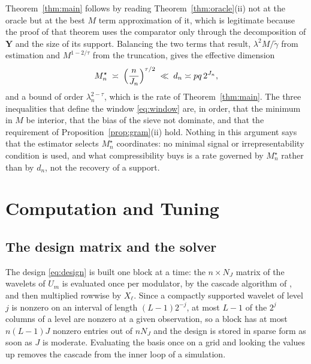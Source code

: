 \documentclass[12pt]{article} %
\theoremstyle{definition}
\newcommand{\cv}{\ell}
\newcommand{\md}{m}
\newcommand{\lev}{j}
\newcommand{\NJ}{N_{J}}
\newcommand{\pen}{\lambda}
\newcommand{\penn}{\lambda_{n}}
\newcommand{\bY}{\mathbf{Y}}
\newcommand{\gtil}{\widetilde{\gamma}}
\newcommand{\Mstar}{M^{\star}}
\begin{document}
Theorem~\ref{thm:main} follows by reading Theorem~\ref{thm:oracle}(ii) not at
the oracle but at the best $M$ term approximation of it, which is legitimate
because the proof of that theorem uses the comparator only through the
decomposition of $\bY$ and the size of its support. Balancing the two terms
that result, $\pen^{2}M/\gtil$ from estimation and
$M^{1-2/\tau}$ from the truncation, gives the effective dimension
\begin{equation}
  \label{eq:Mstar}
  \Mstar_n \;\asymp\; \Bigl(\frac{n}{J_n}\Bigr)^{\tau/2}
  \;\ll\; d_n \asymp pq\,2^{J_n},
\end{equation}
and a bound of order $\penn^{2-\tau}$, which is the rate of
Theorem~\ref{thm:main}. The three inequalities that define the window
\eqref{eq:window} are, in order, that the minimum in $M$ be interior, that the
bias of the sieve not dominate, and that the requirement of
Proposition~\ref{prop:gram}(ii) hold. Nothing in this argument says that the
estimator selects $\Mstar_n$ coordinates: no minimal signal or
irrepresentability condition is used, and what compressibility buys is a rate
governed by $\Mstar_n$ rather than by $d_n$, not the recovery of a support.

\section{Computation and Tuning}
\label{sec:computation}

\subsection{The design matrix and the solver}
\label{sec:solver}

The design \eqref{eq:design} is built one block at a time: the $n \times \NJ$
matrix of the wavelets of $U_{\md}$ is evaluated once per modulator, by the
cascade algorithm of \citet{Daubechies-Lagarias-1991}, and then multiplied
rowwise by $X_{\cv}$. Since a compactly supported wavelet of level $\lev$ is
nonzero on an interval of length $(L-1)2^{-\lev}$, at most $L-1$ of the
$2^{\lev}$ columns of a level are nonzero at a given observation, so a block
has at most $n(L-1)J$ nonzero entries out of $n\NJ$ and the design is stored in
sparse form as soon as $J$ is moderate. Evaluating the basis once on a grid and
looking the values up removes the cascade from the inner loop of a
simulation.
\end{document}
